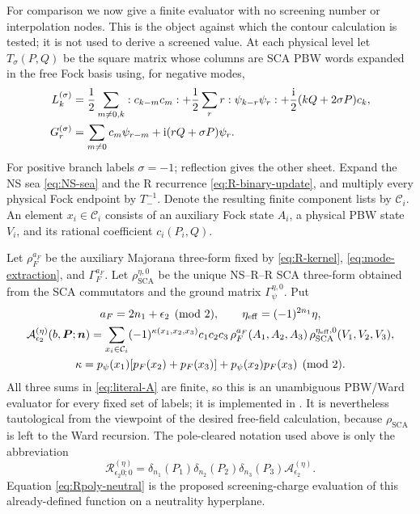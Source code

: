 \documentclass[11pt]{article}
\newcommand{\SCA}{\mathrm{SCA}}
\newcommand{\cR}{\mathcal R}
\newcommand{\eps}{\epsilon}
\newcommand{\ii}{\mathrm i}
\begin{document}
For comparison we now give a finite evaluator with no screening number or
interpolation nodes.  This is the object against which the contour
calculation is tested; it is not used to derive a screened value.  At each
physical level let $T_\sigma(P,Q)$ be the
square matrix whose columns are SCA PBW words expanded in the free Fock
basis using, for negative modes,
\begin{align}
 L_k^{(\sigma)}&=\frac12\sum_{m\ne0,k}:c_{k-m}c_m:
 +\frac12\sum_r r:\psi_{k-r}\psi_r:
 +\frac{\ii}{2}(kQ+2\sigma P)c_k,\notag\\
 G_r^{(\sigma)}&=\sum_{m\ne0}c_m\psi_{r-m}
 +\ii(rQ+\sigma P)\psi_r.
 \label{eq:free-field-transition}
\end{align}
For positive branch labels $\sigma=-1$; reflection gives the other sheet.
Expand the NS sea \eqref{eq:NS-sea} and the R recurrence
\eqref{eq:R-binary-update}, and multiply every physical Fock endpoint by
$T_{-}^{-1}$.  Denote the resulting finite component lists by
$\mathcal C_i$.  An element $x_i\in\mathcal C_i$ consists of an auxiliary
Fock state $A_i$, a physical PBW state $V_i$, and its rational coefficient
$c_i(P_i,Q)$.

Let $\rho_F^{a_F}$ be the auxiliary Majorana three-form fixed by
\eqref{eq:R-kernel}, \eqref{eq:mode-extraction}, and
$\Gamma_F^{a_F}$.  Let $\rho_{\SCA}^{\eta,0}$ be the unique NS--R--R SCA
three-form obtained from the SCA commutators and the ground matrix
$\Gamma_\psi^{\eta,0}$.  Put
\begin{gather}
 a_F=2n_1+\eps_2\pmod2,\qquad
 \eta_{\rm eff}=(-1)^{2n_1}\eta,\notag\\
 \mathcal A_{\eps_2}^{(\eta)}(b,\boldsymbol P;\boldsymbol n)
 =\sum_{x_i\in\mathcal C_i}(-1)^{\kappa(x_1,x_2,x_3)}
 c_1c_2c_3\,
 \rho_F^{a_F}(A_1,A_2,A_3)\,
 \rho_{\SCA}^{\eta_{\rm eff},0}(V_1,V_2,V_3),
 \label{eq:literal-A}\\
 \kappa=p_\psi(x_1)[p_F(x_2)+p_F(x_3)]
 +p_\psi(x_2)p_F(x_3)\pmod2.
 \notag
\end{gather}
All three sums in \eqref{eq:literal-A} are finite, so this is an unambiguous
PBW/Ward evaluator for every fixed set of labels; it is implemented in
.  It is nevertheless tautological from the
viewpoint of the desired free-field calculation, because
$\rho_{\SCA}$ is left to the Ward recursion.  The pole-cleared notation used
above is only the abbreviation
\begin{equation}
 \cR_{\eps_2 0;0}^{(\eta)}
 =\delta_{n_1}(P_1)\delta_{n_2}(P_2)\delta_{n_3}(P_3)
 \mathcal A_{\eps_2}^{(\eta)}.
 \label{eq:R-is-A}
\end{equation}
Equation \eqref{eq:Rpoly-neutral} is the proposed screening-charge
evaluation of this already-defined function on a neutrality hyperplane.
\end{document}
